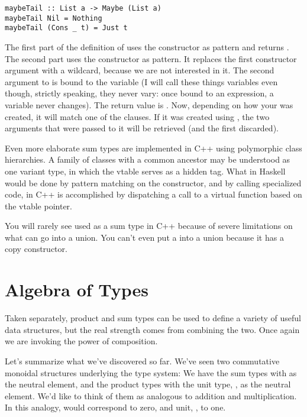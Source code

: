 \begin{Verbatim}
maybeTail :: List a -> Maybe (List a)
maybeTail Nil = Nothing
maybeTail (Cons _ t) = Just t
\end{Verbatim}
The first part of the definition of  uses the
 constructor as pattern and returns . The
second part uses the  constructor as pattern. It replaces
the first constructor argument with a wildcard, because we are not
interested in it. The second argument to  is bound to the
variable  (I will call these things variables even though,
strictly speaking, they never vary: once bound to an expression, a
variable never changes). The return value is . Now,
depending on how your  was created, it will match one of
the clauses. If it was created using , the two arguments
that were passed to it will be retrieved (and the first discarded).

Even more elaborate sum types are implemented in C++ using polymorphic
class hierarchies. A family of classes with a common ancestor may be
understood as one variant type, in which the vtable serves as a hidden
tag. What in Haskell would be done by pattern matching on the
constructor, and by calling specialized code, in C++ is accomplished by
dispatching a call to a virtual function based on the vtable pointer.

You will rarely see  used as a sum type in C++ because of
severe limitations on what can go into a union. You can't even put a
 into a union because it has a copy constructor.

\section{Algebra of Types}

Taken separately, product and sum types can be used to define a variety
of useful data structures, but the real strength comes from combining
the two. Once again we are invoking the power of composition.

Let's summarize what we've discovered so far. We've seen two commutative
monoidal structures underlying the type system: We have the sum types
with  as the neutral element, and the product types with
the unit type, \code{()}, as the neutral element. We'd like to think
of them as analogous to addition and multiplication. In this analogy,
 would correspond to zero, and unit, \code{()}, to one.

